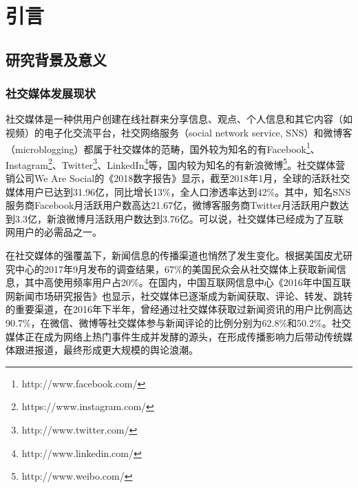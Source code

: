 \documentclass[a4paper,oneside,12pt]{book}
\begin{document}
  
\newpage

 
\newpage

\frontmatter\tableofcontents %

\newpage\mainmatter
{} %
\pagestyle{fancy} %


\chapter{引言}
\section{研究背景及意义}
\subsection{社交媒体发展现状}
社交媒体是一种供用户创建在线社群来分享信息、观点、个人信息和其它内容（如视频）的电子化交流平台，社交网络服务（social network service, SNS）和微博客（microblogging）都属于社交媒体的范畴\cite{webster_social_media}，国外较为知名的有Facebook\footnote{http://www.facebook.com/}、Instagram\footnote{https://www.instagram.com/}、Twitter\footnote{http://www.twitter.com/}、LinkedIn\footnote{http://www.linkedin.com/}等，国内较为知名的有新浪微博\footnote{http://www.weibo.com/}。社交媒体营销公司We Are Social的《2018数字报告》\cite{digital_in_2018}显示，截至2018年1月，全球的活跃社交媒体用户已达到31.96亿，同比增长13\%，全人口渗透率达到42\%。其中，知名SNS服务商Facebook月活跃用户数高达21.67亿，微博客服务商Twitter月活跃用户数达到3.3亿，新浪微博月活跃用户数达到3.76亿。可以说，社交媒体已经成为了互联网用户的必需品之一。

在社交媒体的强覆盖下，新闻信息的传播渠道也悄然了发生变化。根据美国皮尤研究中心的2017年9月发布的调查结果\cite{pew_news_use_2017}，67\%的美国民众会从社交媒体上获取新闻信息，其中高使用频率用户占20\%。在国内，中国互联网信息中心《2016年中国互联网新闻市场研究报告》\cite{internet_news_2016}也显示，社交媒体已逐渐成为新闻获取、评论、转发、跳转的重要渠道，在2016年下半年，曾经通过社交媒体获取过新闻资讯的用户比例高达90.7\%，在微信、微博等社交媒体参与新闻评论的比例分别为62.8\%和50.2\%。社交媒体正在成为网络上热门事件生成并发酵的源头，在形成传播影响力后带动传统媒体跟进报道，最终形成更大规模的舆论浪潮。
\end{document}

